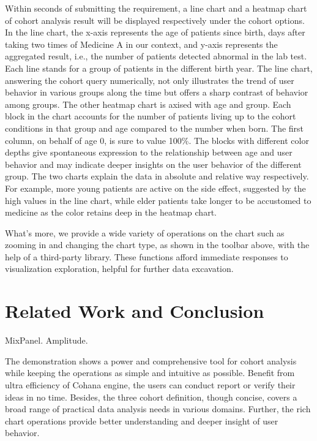 \documentclass[10pt,conference,letterpaper]{IEEEtran}
\begin{document}
Within seconds of submitting the requirement, a line chart and a heatmap chart of cohort analysis result will be displayed respectively under the cohort options. In the line chart, the x-axis represents the age of patients since birth, days after taking two times of Medicine A in our context, and y-axis represents the aggregated result, i.e., the number of patients detected abnormal in the lab test. Each line stands for a group of patients in the different birth year. The line chart, answering the cohort query numerically, not only illustrates the trend of user behavior in various groups along the time but offers a sharp contrast of behavior among groups. The other heatmap chart is axised with age and group. Each block in the chart accounts for the number of patients living up to the cohort conditions in that group and age compared to the number when born. The first column, on behalf of age 0, is sure to value 100\%. The blocks with different color depths give spontaneous expression to the relationship between age and user behavior and may indicate deeper insights on the user behavior of the different group. The two charts explain the data in absolute and relative way respectively. For example, more young patients are active on the side effect, suggested by the high values in the line chart, while elder patients take longer to be accustomed to medicine as the color retains deep in the heatmap chart.

What's more, we provide a wide variety of operations on the chart such as zooming in and changing the chart type, as shown in the toolbar above, with the help of a third-party library. These functions afford immediate responses to visualization exploration, helpful for further data excavation.

\section{Related Work and Conclusion}

MixPanel. Amplitude. 

The demonstration shows a power and comprehensive tool for cohort analysis while keeping the operations as simple and intuitive as possible. Benefit from ultra efficiency of Cohana engine, the users can conduct report or verify their ideas in no time. Besides, the three cohort definition, though concise, covers a broad range of practical data analysis needs in various domains. Further, the rich chart operations provide better understanding and deeper insight of user behavior.







\end{document}
